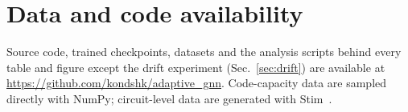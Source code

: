 \documentclass[a4paper,twocolumn,11pt,nopdfoutputerror]{quantumarticle}
\begin{document}
\section*{Data and code availability}

Source code, trained checkpoints, datasets and the analysis scripts
behind every table and figure except the drift experiment
(Sec.~\ref{sec:drift}) are available at
\url{https://github.com/kondshk/adaptive_gnn}. Code-capacity data are
sampled directly with NumPy; circuit-level data are generated with
Stim~\cite{Gidney2021Stim}.

\setlength{\bibsep}{1pt plus 0.3ex}


\end{document}
